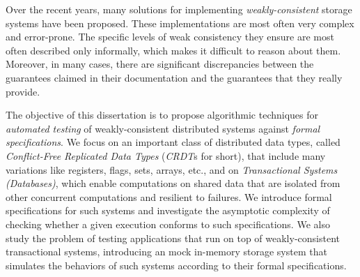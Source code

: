 Over the recent years, many solutions for implementing \emph{weakly-consistent} storage systems have been proposed. 
These implementations are most often very complex and error-prone.
The specific levels of weak consistency they ensure are most often described only informally, which makes it difficult to reason about them.
Moreover, in many cases, there are significant discrepancies between the guarantees claimed in their documentation and the guarantees that they really provide.


The objective of this dissertation is to propose algorithmic techniques for \emph{automated testing} of weakly-consistent distributed systems against \emph{formal specifications}. We focus on an important class of distributed data types, called \emph{Conflict-Free Replicated Data Types} (\emph{CRDT}s for short), that include many variations like registers, flags, sets, arrays, etc., and on \emph{Transactional Systems (Databases)}, which enable computations on shared data that are isolated from other concurrent computations and resilient to failures. We introduce formal specifications for such systems and investigate the asymptotic complexity of checking whether a given execution conforms to such specifications. We also 
study the problem of testing applications that run on top of weakly-consistent transactional systems, introducing an mock in-memory storage system that simulates the behaviors of such systems according to their formal specifications.


